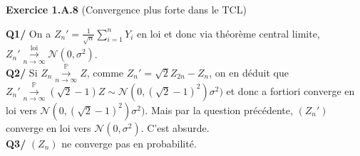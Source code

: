 \documentclass[a4paper,12pt]{article}
\begin{document}
\textbf{Exercice 1.A.8} (Convergence plus forte dans le TCL)

\textbf{Q1/} On a $Z_n'=\frac{1}{\sqrt{n}} \sum_{i=1}^n Y_i$ en loi et donc via théorème central limite, $Z_n' \overset{\text{loi}}{\underset{n \to \infty}{\longrightarrow}} \mathcal{N} (0, \sigma^2)$. \\

\textbf{Q2/} Si $Z_n \overset{\mathbb{P}}{\underset{n \to \infty}{\longrightarrow}} Z$, comme $Z_n' = \sqrt{2} Z_{2n} - Z_n$, on en déduit que $Z_n' \overset{\mathbb{P}}{\underset{n \to \infty}{\longrightarrow}} (\sqrt{2}-1)Z \sim \mathcal{N} (0, (\sqrt{2}-1)^2) \sigma^2)$ et donc a fortiori converge en loi vers $\mathcal{N} (0, (\sqrt{2}-1)^2) \sigma^2)$. Mais par la question précédente, $(Z_n')$ converge en loi vers $\mathcal{N}(0, \sigma^2)$. C'est absurde. \\

\textbf{Q3/} $(Z_n)$ ne converge pas en probabilité.
\end{document}
